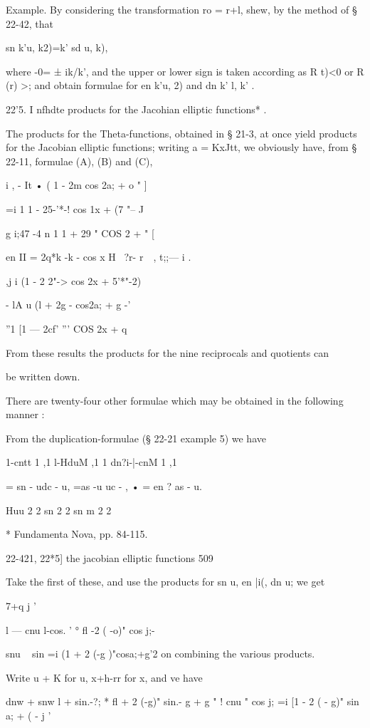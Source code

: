 Example. By considering the transformation ro = r+l, shew, by the
method of § 22-42, that

sn k'u, k2)=k' sd u, k),

where -0= ± ik/k', and the upper or lower sign is taken according as R
t)<0 or R (r) >; and obtain formulae for en k'u, 2) and dn k' l, k' .

22'5. I nfhdte products for the Jacohian elliptic functions* .

The products for the Theta-functions, obtained in § 21-3, at once
yield products for the Jacobian elliptic functions; writing a =
KxJtt, we obviously have, from § 22-11, formulae (A), (B) and (C),

  i , - It • ( 1 - 2m cos 2a; + o " ]

   =i 1 1 - 25-'*-! cos 1x + (7 "-- J

g i;47 -4 n 1 1 + 29 " COS 2 + " [

en II = 2q*k -k - cos x H \ ?r- r~~, t;;— i .

  ,j i (1 - 2 2"-> cos 2x + 5'*"-2)

- lA u (l + 2g - cos2a; + g -'

''1 [1 — 2cf' ''' COS 2x + q

From these results the products for the nine reciprocals and quotients
can

be written down.

There are twenty-four other formulae which may be obtained in the
following manner :

From the duplication-formulae (§ 22-21 example 5) we have

1-cntt 1 ,1 l-HduM ,1 1 dn?i-|-cnM 1 ,1

= sn - udc - u, =as -u uc - , • = en ? as - u.

Huu 2 2 sn 2 2 sn m 2 2

* Fundamenta Nova, pp. 84-115.

22-421, 22*5] the jacobian elliptic functions 509

Take the first of these, and use the products for sn u, en |i(, dn u;
we get

7+q j '

l — cnu l-cos. ' ° fl -2 ( -o)" cos j;-

snu ~ sin =i (1 + 2 (-g )"cosa;+g'2 on combining the various products.

Write u + K for u, x+h-rr for x, and ve have

dnw + snw l + sin.-?; * fl + 2 (-g)" sin.- g + g " ! cnu " cos j; =i
[1 - 2 ( - g)" sin a; + ( - j '

